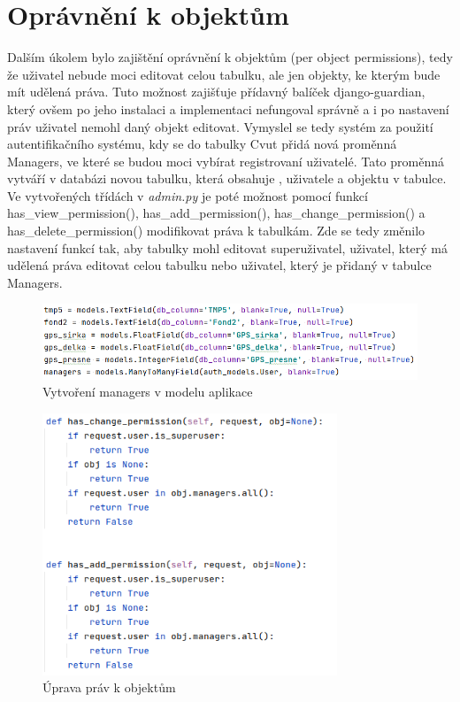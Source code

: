 \section{Oprávnění k objektům}
\label{pop}
Dalším úkolem bylo zajištění oprávnění k objektům (per object permissions), tedy že uživatel nebude moci editovat celou tabulku, ale jen objekty, ke kterým bude mít udělená práva. Tuto možnost zajišťuje přídavný balíček django-guardian, který ovšem po jeho instalaci a implementaci nefungoval správně a i po nastavení práv uživatel nemohl daný objekt editovat. Vymyslel se tedy systém za použití autentifikačního systému, kdy se do tabulky Cvut přidá nová proměnná Managers, ve které se budou moci vybírat registrovaní uživatelé. Tato proměnná vytváří v databázi novou tabulku, která obsahuje ,  uživatele a  objektu v tabulce. Ve vytvořených třídách v \emph{admin.py} je poté možnost pomocí funkcí has\_view\_permission(), has\_add\_permission(), has\_change\_permission() a has\_delete\_permission() modifikovat práva k tabulkám. Zde se tedy změnilo nastavení funkcí tak, aby tabulky mohl editovat superuživatel, uživatel, který má udělená práva editovat celou tabulku nebo uživatel, který je přidaný v tabulce Managers. 

\begin{figure}[H] \centering
    \includegraphics[width=330pt]{./pictures/11-managers-model.PNG}
    \caption[Vytvoření managers v modelu aplikace]{Vytvoření managers v modelu aplikace}
	\label{fig:Vytvoření managers v modelu aplikace}              
\end{figure}

\begin{figure}[H] \centering
    \includegraphics[width=250pt]{./pictures/14-object-permissions.PNG}
    \caption[Úprava práv k objektům]{Úprava práv k objektům}
	\label{fig:Úprava práv k objektům}              
\end{figure}


